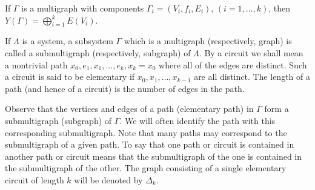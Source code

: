 If $\Gamma$ is a multigraph with components $\Gamma_i = (V_i, f_i, E_i)$, $(i = 1, \ldots, k)$, then $Y(\Gamma) = \bigoplus_{i=1}^{k} E(V_i)$.

If $\Lambda$ is a system, a subsystem $\Gamma$ which is a multigraph (respectively, graph) is called a submultigraph (respectively, subgraph) of $\Lambda$. By a circuit we shall mean a nontrivial path $x_0, e_1, x_1, \ldots, e_k, x_k = x_0$ where all of the edges are distinct. Such a circuit is said to be elementary if $x_0, x_1, \ldots, x_{k-1}$ are all distinct. The length of a path (and hence of a circuit) is the number of edges in the path.

Observe that the vertices and edges of a path (elementary path) in $\Gamma$ form a submultigraph (subgraph) of $\Gamma$. We will often identify the path with this corresponding submultigraph. Note that many paths may correspond to the submultigraph of a given path. To say that one path or circuit is contained in another path or circuit means that the submultigraph of the one is contained in the submultigraph of the other. The graph consisting of a single elementary circuit of length $k$ will be denoted by $\Delta_k$.
